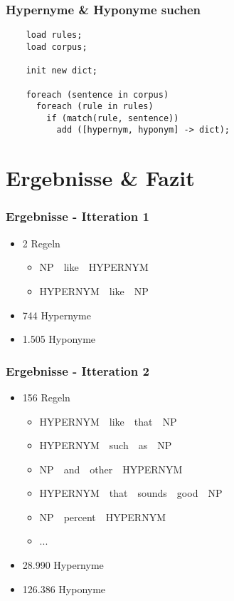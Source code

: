 \begin{frame}[fragile]
  \frametitle{Hypernyme \& Hyponyme suchen}

  \begin{lstlisting}
    load rules;
    load corpus;

    init new dict;

    foreach (sentence in corpus)
      foreach (rule in rules)
        if (match(rule, sentence))
          add ([hypernym, hyponym] -> dict);
  \end{lstlisting}
\end{frame}

\section{Ergebnisse \& Fazit}

\begin{frame}
  \frametitle{Ergebnisse - Itteration 1}

  \begin{itemize}
  \item 2 Regeln
    \begin{itemize}
    \item NP~\textpipe~like~\textpipe~HYPERNYM
    \item HYPERNYM~\textpipe~like~\textpipe~NP
    \end{itemize}

  \item 744 Hypernyme
  \item 1.505 Hyponyme
  \end{itemize}
\end{frame}

\begin{frame}
  \frametitle{Ergebnisse - Itteration 2}

  \begin{itemize}
  \item 156 Regeln
    \begin{itemize}
    \item HYPERNYM~\textpipe~like~\textpipe~that~\textpipe~NP
    \item HYPERNYM~\textpipe~such~\textpipe~as~\textpipe~NP
    \item NP~\textpipe~and~\textpipe~other~\textpipe~HYPERNYM
    \item HYPERNYM~\textpipe~that~\textpipe~sounds~\textpipe~good~\textpipe~NP
    \item NP~\textpipe~percent~\textpipe~HYPERNYM
    \item ...
    \end{itemize}

  \item 28.990 Hypernyme
  \item 126.386 Hyponyme
  \end{itemize}
\end{frame}

